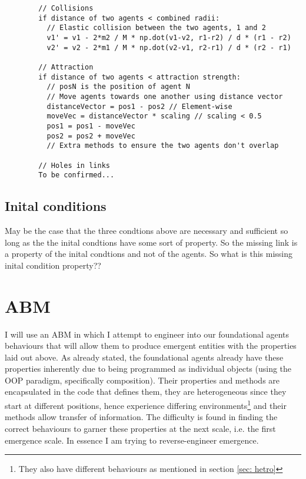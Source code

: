 \documentclass{article}
\begin{document}
      \begin{verbatim}
        // Collisions
        if distance of two agents < combined radii:
          // Elastic collision between the two agents, 1 and 2
          v1' = v1 - 2*m2 / M * np.dot(v1-v2, r1-r2) / d * (r1 - r2) 
          v2' = v2 - 2*m1 / M * np.dot(v2-v1, r2-r1) / d * (r2 - r1)

        // Attraction
        if distance of two agents < attraction strength:
          // posN is the position of agent N
          // Move agents towards one another using distance vector 
          distanceVector = pos1 - pos2 // Element-wise 
          moveVec = distanceVector * scaling // scaling < 0.5
          pos1 = pos1 - moveVec
          pos2 = pos2 + moveVec
          // Extra methods to ensure the two agents don't overlap

        // Holes in links
        To be confirmed...
      \end{verbatim}


  \subsection{Inital conditions}
    
    May be the case that the three condtions above are necessary and sufficient so long as the the inital condtions have some sort of property. So the missing link is a property of the inital condtions and not of the agents. So what is this missing inital condition property??


\section{ABM}

  I will use an ABM in which I attempt to engineer into our foundational agents behaviours that will allow them to produce emergent entities with the properties laid out above. As already stated, the foundational agents already have these properties inherently due to being programmed as individual objects (using the OOP paradigm, specifically composition). Their properties and methods are encapsulated in the code that defines them, they are heterogeneous since they start at different positions, hence experience differing environments\footnote{They also have different behaviours as mentioned in section \ref{sec: hetro}} and their methods allow transfer of information. The difficulty is found in finding the correct behaviours to garner these properties at the next scale, i.e. the first emergence scale. In essence I am trying to reverse-engineer emergence.
\end{document}
